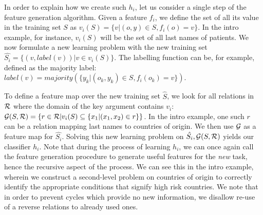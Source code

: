 \documentclass[twoside,11pt]{article}
\theoremstyle{definition}
\begin{document}
In order to explain how we create such $h_{i}$, let us consider a single step of the feature generation algorithm.
Given a feature $f_{i}$, we define the set of all its value in the training set $S$ as $v_i(S) = \{v | (o,y) \in S, f_{i}(o)=v\}$. In the intro example, for instance, $v_i(S)$ will be the set of all last names of patients.
We now formulate a new learning problem with the new training set
$\hat{S_i} = \{ (v, label(v)) | v \in v_i(S) \}$.
The labelling function can be, for example, defined as
the majority label: $label(v)=majority(\{y_k| \left(o_k,y_k \right) \in S, f_{i}(o_k)=v\})$.

To define a feature map over the new training set $\hat{S}$, we look for all relations in $\cal R$ where the domain of the key argument contains $v_i$:
${\cal G}(S,{\cal R}) = \left\{ r \in {\cal R} | v_i(S) \subseteq \{x_1 | (x_1,x_2) \in r\}\right\}$. In the intro example, one such $r$ can be a relation mapping last names to countries of origin. We then use ${\cal G}$ as a feature map for $\hat{S_i}$.
Solving this new learning problem on $\hat{S_i}, {\cal G}(S,{\cal R})$ yields our classifier $h_{i}$.
Note that during the process of learning $h_{i}$, we can once again call the feature generation procedure to generate useful features for the \emph{new} task, hence the recursive aspect of the process. We can see this in the intro example, wherein we construct a second-level problem on countries of origin to correctly identify the appropriate conditions that signify high risk countries.
We note that in order to prevent cycles which provide no new information, we disallow re-use of a reverse relations to already used ones.
\end{document}
